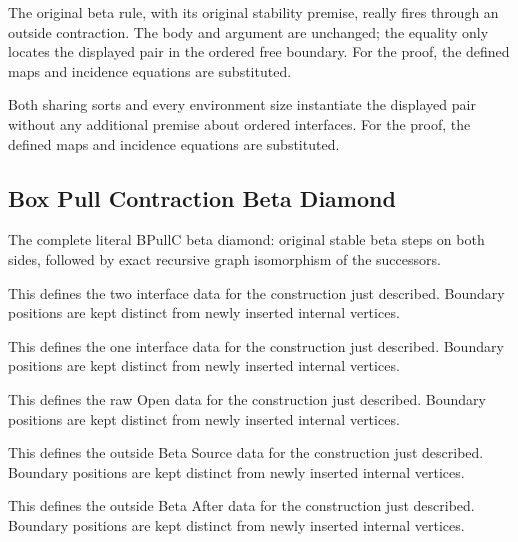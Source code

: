The original beta rule, with its original stability premise, really fires through an outside contraction. The body and argument are unchanged; the equality only locates the displayed pair in the ordered free boundary.
For the proof, the defined maps and incidence equations are substituted.
\par{}

Both sharing sorts and every environment size instantiate the displayed pair without any additional premise about ordered interfaces.
For the proof, the defined maps and incidence equations are substituted.
\par{}

\subsection{Box Pull Contraction Beta Diamond}
The complete literal BPullC beta diamond: original stable beta steps on both sides, followed by exact recursive graph isomorphism of the successors.

This defines the two interface data for the construction just described. Boundary positions are kept distinct from newly inserted internal vertices.
\par{}

This defines the one interface data for the construction just described. Boundary positions are kept distinct from newly inserted internal vertices.
\par{}

This defines the raw Open data for the construction just described. Boundary positions are kept distinct from newly inserted internal vertices.
\par{}

This defines the outside Beta Source data for the construction just described. Boundary positions are kept distinct from newly inserted internal vertices.
\par{}

This defines the outside Beta After data for the construction just described. Boundary positions are kept distinct from newly inserted internal vertices.
\par{}


